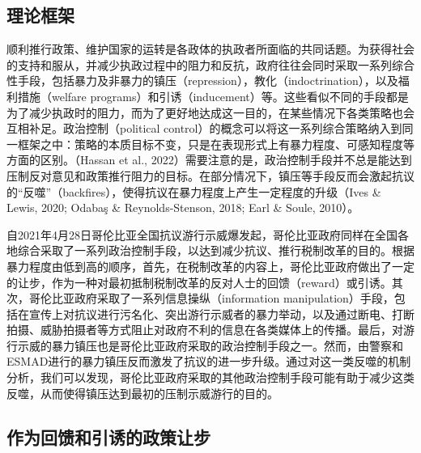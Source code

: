 \documentclass{phyasgn}\usepackage{nag}
\begin{document}
\subsection{理论框架}
顺利推行政策、维护国家的运转是各政体的执政者所面临的共同话题。为获得社会的支持和服从，并减少执政过程中的阻力和反抗，政府往往会同时采取一系列综合性手段，包括暴力及非暴力的镇压（repression），教化（indoctrination），以及福利措施（welfare programs）和引诱（inducement）等。这些看似不同的手段都是为了减少执政时的阻力，而为了更好地达成这一目的，在某些情况下各类策略也会互相补足。政治控制（political control）的概念可以将这一系列综合策略纳入到同一框架之中：策略的本质目标不变，只是在表现形式上有暴力程度、可感知程度等方面的区别。（Hassan et al., 2022）需要注意的是，政治控制手段并不总是能达到压制反对意见和政策推行阻力的目标。在部分情况下，镇压等手段反而会激起抗议的“反噬”（backfires），使得抗议在暴力程度上产生一定程度的升级（Ives \& Lewis, 2020; Odabaş \& Reynolds-Stenson, 2018; Earl \& Soule, 2010）。
\par 自2021年4月28日哥伦比亚全国抗议游行示威爆发起，哥伦比亚政府同样在全国各地综合采取了一系列政治控制手段，以达到减少抗议、推行税制改革的目的。根据暴力程度由低到高的顺序，首先，在税制改革的内容上，哥伦比亚政府做出了一定的让步，作为一种对最初抵制税制改革的反对人士的回馈（reward）或引诱。其次，哥伦比亚政府采取了一系列信息操纵（information manipulation）手段，包括在宣传上对抗议进行污名化、突出游行示威者的暴力举动，以及通过断电、打断拍摄、威胁拍摄者等方式阻止对政府不利的信息在各类媒体上的传播。最后，对游行示威的暴力镇压也是哥伦比亚政府采取的政治控制手段之一。然而，由警察和ESMAD进行的暴力镇压反而激发了抗议的进一步升级。通过对这一类反噬的机制分析，我们可以发现，哥伦比亚政府采取的其他政治控制手段可能有助于减少这类反噬，从而使得镇压达到最初的压制示威游行的目的。
\subsection{作为回馈和引诱的政策让步}
\end{document}
